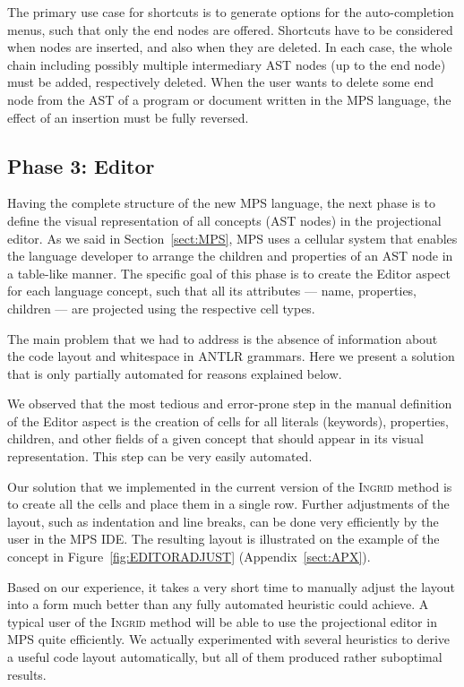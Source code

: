 The primary use case for shortcuts is to generate options for the auto-completion menus, such that only the end nodes are offered.
Shortcuts have to be considered when nodes are inserted, and also when they are deleted.
In each case, the whole chain including possibly multiple intermediary AST nodes (up to the end node) must be added, respectively deleted.
When the user wants to delete some end node from the AST of a program or document written in the MPS language, the effect of an insertion must be fully reversed.

\subsection{Phase 3: Editor}
\label{sect:EDITORDEF}

Having the complete structure of the new MPS language, the next phase is to define the visual representation of all concepts (AST nodes) in the projectional editor.
As we said in Section~\ref{sect:MPS}, MPS uses a cellular system that enables the language developer to arrange the children and properties of an AST node in a table-like manner.
The specific goal of this phase is to create the Editor aspect for each language concept, such that all its attributes --- name, properties, children --- are projected using the respective cell types.

The main problem that we had to address is the absence of information about the code layout and whitespace in ANTLR grammars.
Here we present a solution that is only partially automated for reasons explained below.

We observed that the most tedious and error-prone step in the manual definition of the Editor aspect is the creation of cells for all literals (keywords), properties, children, and other fields of a given concept that should appear in its visual representation.
This step can be very easily automated.

Our solution that we implemented in the current version of the \textsc{Ingrid} method is to create all the cells and place them in a single row.
Further adjustments of the layout, such as indentation and line breaks, can be done very efficiently by the user in the MPS IDE.
The resulting layout is illustrated on the example of the  concept in Figure~\ref{fig:EDITORADJUST} (Appendix~\ref{sect:APX}).

Based on our experience, it takes a very short time to manually adjust the layout into a form much better than any fully automated heuristic could achieve.
A typical user of the \textsc{Ingrid} method will be able to use the projectional editor in MPS quite efficiently.
We actually experimented with several heuristics to derive a useful code layout automatically, but all of them produced rather suboptimal results.

